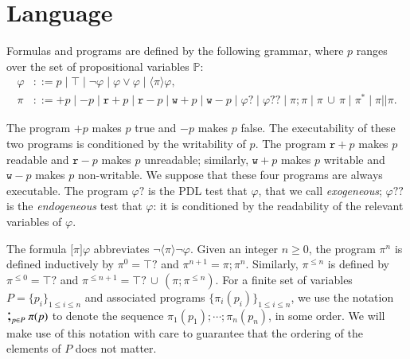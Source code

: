\documentclass{llncs}
\newcommand{\atm}{x}
\newcommand{\pll}{ {||} }							%
\newcommand{\testendo}{?\!\!?}			%
\newcommand{\testpdl}{?}				%
\newcommand{\ah}[1]{\footnote{\textbf{AH:} #1}}
\newcommand{\assgn}[2]{{#1 {:=} #2}}
\newcommand{\assgntopR}[1]{{\mathtt r {+} #1}}
\newcommand{\assgnbotR}[1]{{\mathtt r {-} #1}}
\newcommand{\assgntopW}[1]{{\mathtt w {+} #1}}
\newcommand{\assgnbotW}[1]{{\mathtt w {-} #1}}
\newcommand{\assgntopV}[1]{{\mathtt {+} #1}}
\newcommand{\assgnbotV}[1]{{\mathtt {-} #1}}
\newcommand{\ifthen}[2]{\mathbf{if}\ #1 \ \mathbf{then}\ #2}
\newcommand{\lbox}[1]{ \big[ #1 \big] }
\newcommand{\ldia}[1]{ \big\langle #1 \big\rangle}
\newcommand{\ndet}{\,{\cup}\,}
\renewcommand{\phi}{\varphi}
\newcommand{\propset}{\mathbb P}
\newcommand{\seqseq}[1]{ \text{\Large ;}_{#1} ~ }
\begin{document}
\section{Language}\label{sec:language}

Formulas and programs are defined by the following grammar,
where $p$ ranges over the set of propositional variables $\propset$:
\begin{align*}
\phi & ::= p \mid \top  \mid  \lnot \phi  \mid  \phi \lor \phi  \mid  \ldia \pi \phi ,
\\
\pi & ::= \assgntopV p \mid \assgnbotV p \mid
		\assgntopR p \mid \assgnbotR p \mid
		\assgntopW p \mid \assgnbotW p \mid
			\phi \testpdl \mid 
			\phi \testendo \mid 
			\pi ; \pi \mid \pi \ndet \pi \mid 
			\pi^\ast \mid \pi \pll \pi .
\end{align*}

The program $\assgntopV p$ makes $p$ true and $\assgnbotV p $ makes $p$ false. 
The executability of these two programs is conditioned by the writability of $p$. 
%
The program $\assgntopR p$ makes $p$ readable and 
$\assgnbotR p $ makes $p$ unreadable; similarly,
$\assgntopW p$ makes $p$ writable and 
$\assgnbotW p$ makes $p$ non-writable.
We suppose that these four programs are always executable. 
The program $\phi \testpdl$ is the PDL test that $\phi$, that we call \emph{exogeneous};
$\phi \testendo $ is the \emph{endogeneous} test that $\phi$: it is 
conditioned by the readability of the relevant variables of $\phi$. 

The formula $\lbox \pi \phi$ abbreviates $\lnot \ldia \pi \lnot \phi$.
Given an integer $n \geq 0$, the program $\pi^n$ is defined inductively by 
$\pi^0 = \top \testpdl $ and 
$\pi^{n+1} = \pi ; \pi^n $. 
Similarly, $\pi^{\leq n}$ is defined by 
$\pi^{\leq 0} = \top \testpdl $ and 
$\pi^{\leq n+1} = \top \testpdl \ndet (\pi ; \pi^{\leq n}) $. 
For a finite set of variables 
$P = \{p_i\}_{1 \leq  i \leq n}$ 
and associated programs 
$\{ \pi_i(p_i)\}_{1 \leq  i \leq n}$,
we use the notation
$\seqseq{p \in P} \pi(p)$ to denote the sequence
$ \pi_1(p_1) ; \cdots ; \pi_n(p_n)$, in some order. 
We will make use of this notation with care to guarantee that the ordering of the elements of $P$ does not matter. 
\end{document}

